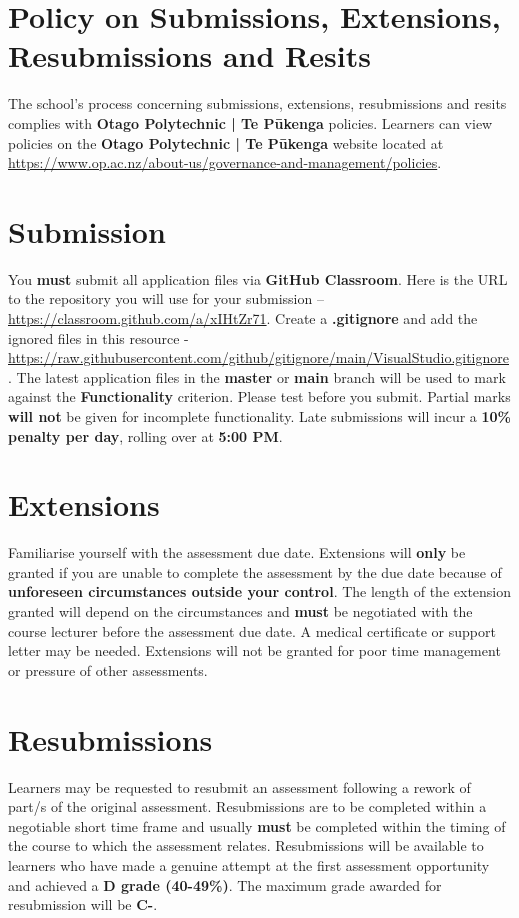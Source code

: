 \documentclass{article}
\begin{document}
\section*{Policy on Submissions, Extensions, Resubmissions and Resits}
The school's process concerning submissions, extensions, resubmissions and resits complies with \textbf{Otago Polytechnic | Te Pūkenga} policies. Learners can view policies on the \textbf{Otago Polytechnic | Te Pūkenga} website located at \href{https://www.op.ac.nz/about-us/governance-and-management/policies}{https://www.op.ac.nz/about-us/governance-and-management/policies}.

\section*{Submission}
You \textbf{must} submit all application files via \textbf{GitHub Classroom}. Here is the URL to the repository you will use for your submission – \href{https://classroom.github.com/a/xIHtZr71}{https://classroom.github.com/a/xIHtZr71}.  Create a \textbf{.gitignore} and add the ignored files in this resource - \href{https://raw.githubusercontent.com/github/gitignore/main/VisualStudio.gitignore}{https://raw.githubusercontent.com/github/gitignore/main/VisualStudio.gitignore}. The latest application files in the \textbf{master} or \textbf{main} branch will be used to mark against the \textbf{Functionality} criterion. Please test before you submit. Partial marks \textbf{will not} be given for incomplete functionality. Late submissions will incur a \textbf{10\% penalty per day}, rolling over at \textbf{5:00 PM}.

\section*{Extensions}
Familiarise yourself with the assessment due date. Extensions will \textbf{only} be granted if you are unable to complete the assessment by the due date because of \textbf{unforeseen circumstances outside your control}. The length of the extension granted will depend on the circumstances and \textbf{must} be negotiated with the course lecturer before the assessment due date. A medical certificate or support letter may be needed. Extensions will not be granted for poor time management or pressure of other assessments.

\section*{Resubmissions}
Learners may be requested to resubmit an assessment following a rework of part/s of the original assessment. Resubmissions are to be completed within a negotiable short time frame and usually \textbf{must} be completed within the timing of the course to which the assessment relates. Resubmissions will be available to learners who have made a genuine attempt at the first assessment opportunity and achieved a \textbf{D grade (40-49\%)}. The maximum grade awarded for resubmission will be \textbf{C-}.
\end{document}
